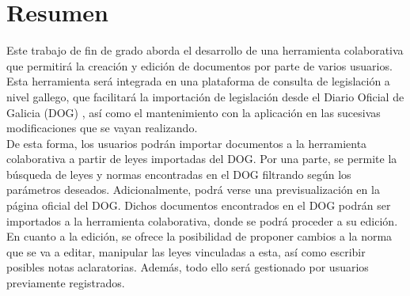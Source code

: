 \pagestyle{plain}
\chapter*{Resumen}
Este trabajo de fin de grado aborda el desarrollo de una herramienta colaborativa que permitirá la creación y edición de documentos por parte de varios usuarios. Esta herramienta será integrada en una plataforma de consulta de legislación a nivel gallego, que facilitará la importación de legislación desde el Diario Oficial de Galicia (DOG) \cite{dog}, así como el mantenimiento con la aplicación en las sucesivas modificaciones que se vayan realizando.
\\

De esta forma, los usuarios podrán importar documentos a la herramienta colaborativa a partir de leyes importadas del DOG. Por una parte, se permite la búsqueda de leyes y normas encontradas en el DOG filtrando según los parámetros deseados. Adicionalmente, podrá verse una previsualización en la página oficial del DOG. Dichos documentos encontrados en el DOG podrán ser importados a la herramienta colaborativa, donde se podrá proceder a su edición. En cuanto a la edición, se ofrece la posibilidad de proponer cambios a la norma que se va a editar, manipular las leyes vinculadas a esta, así como escribir posibles notas aclaratorias. Además, todo ello será gestionado por usuarios previamente registrados.